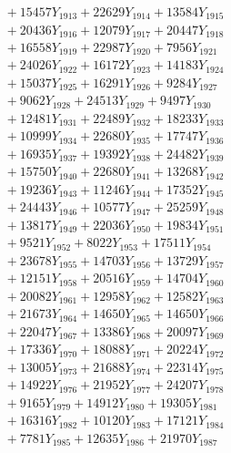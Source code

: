\documentclass[a4paper,10pt]{article}
\begin{document}
{\begin{align}
&\;  + 15457 Y_{1913} + 22629 Y_{1914} + 13584 Y_{1915} \\[0.3ex]
&\;  + 20436 Y_{1916} + 12079 Y_{1917} + 20447 Y_{1918} \\[0.5ex]\allowbreak
&\;  + 16558 Y_{1919} + 22987 Y_{1920} + 7956 Y_{1921} \\[0.3ex]
&\;  + 24026 Y_{1922} + 16172 Y_{1923} + 14183 Y_{1924} \\[0.3ex]
&\;  + 15037 Y_{1925} + 16291 Y_{1926} + 9284 Y_{1927} \\[0.3ex]
&\;  + 9062 Y_{1928} + 24513 Y_{1929} + 9497 Y_{1930} \\[0.3ex]
&\;  + 12481 Y_{1931} + 22489 Y_{1932} + 18233 Y_{1933} \\[0.3ex]
&\;  + 10999 Y_{1934} + 22680 Y_{1935} + 17747 Y_{1936} \\[0.3ex]
&\;  + 16935 Y_{1937} + 19392 Y_{1938} + 24482 Y_{1939} \\[0.3ex]
&\;  + 15750 Y_{1940} + 22680 Y_{1941} + 13268 Y_{1942} \\[0.3ex]
&\;  + 19236 Y_{1943} + 11246 Y_{1944} + 17352 Y_{1945} \\[0.3ex]
&\;  + 24443 Y_{1946} + 10577 Y_{1947} + 25259 Y_{1948} \\[0.5ex]\allowbreak
&\;  + 13817 Y_{1949} + 22036 Y_{1950} + 19834 Y_{1951} \\[0.3ex]
&\;  + 9521 Y_{1952} + 8022 Y_{1953} + 17511 Y_{1954} \\[0.3ex]
&\;  + 23678 Y_{1955} + 14703 Y_{1956} + 13729 Y_{1957} \\[0.3ex]
&\;  + 12151 Y_{1958} + 20516 Y_{1959} + 14704 Y_{1960} \\[0.3ex]
&\;  + 20082 Y_{1961} + 12958 Y_{1962} + 12582 Y_{1963} \\[0.3ex]
&\;  + 21673 Y_{1964} + 14650 Y_{1965} + 14650 Y_{1966} \\[0.3ex]
&\;  + 22047 Y_{1967} + 13386 Y_{1968} + 20097 Y_{1969} \\[0.3ex]
&\;  + 17336 Y_{1970} + 18088 Y_{1971} + 20224 Y_{1972} \\[0.3ex]
&\;  + 13005 Y_{1973} + 21688 Y_{1974} + 22314 Y_{1975} \\[0.3ex]
&\;  + 14922 Y_{1976} + 21952 Y_{1977} + 24207 Y_{1978} \\[0.5ex]\allowbreak
&\;  + 9165 Y_{1979} + 14912 Y_{1980} + 19305 Y_{1981} \\[0.3ex]
&\;  + 16316 Y_{1982} + 10120 Y_{1983} + 17121 Y_{1984} \\[0.3ex]
&\;  + 7781 Y_{1985} + 12635 Y_{1986} + 21970 Y_{1987} \\[0.3ex]

\end{align}}
\end{document}
